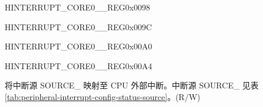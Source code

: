 \begin{register}{H}{INTERRUPT\_CORE0\_\_REG}{0x0098}\label{regdesc:INTERRUPTCORE0CPUINTRFROMCPU2MAPREG}






\end{register}\vspace{-3em}


\begin{register}{H}{INTERRUPT\_CORE0\_\_REG}{0x009C}\label{regdesc:INTERRUPTCORE0CPUINTRFROMCPU3MAPREG}






\end{register}\vspace{-3em}


\begin{register}{H}{INTERRUPT\_CORE0\_\_REG}{0x00A0}\label{regdesc:INTERRUPTCORE0ASSISTDEBUGINTRMAPREG}






\end{register}\vspace{-3em}

















































\begin{register}{H}{INTERRUPT\_CORE0\_\_REG}{0x00A4}\label{regdesc:INTERRUPTCORE0PIFPMSMONITORVIOLATESIZEINTRMAPREG}
%
%
\regnewline%
\begin{regdesc}\begin{reglist}
\label{fielddesc:INTERRUPTCORE0CACHECORE0ACSINTMAP}\item [INTERRUPT\_CORE0\_SOURCE\_\regindex{X}\_MAP] 将中断源 SOURCE\_ 映射至 CPU 外部中断。中断源 SOURCE\_ 见表 \ref{tab:peripheral-interrupt-config-status-source}。(R/W)
\end{reglist}\end{regdesc}
\end{register}


